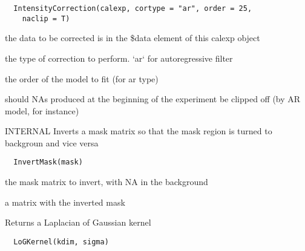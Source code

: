 \documentclass[a4paper]{book}
\begin{document}
%
\begin{Usage}
\begin{verbatim}
  IntensityCorrection(calexp, cortype = "ar", order = 25,
    naclip = T)
\end{verbatim}
\end{Usage}
%
\begin{Arguments}
\begin{ldescription}
\item[\code{calexp}] the data to be corrected is in the \$data
element of this calexp object

\item[\code{cortype}] the type of correction to perform.  `ar`
for autoregressive filter

\item[\code{order}] the order of the model to fit (for ar type)

\item[\code{naclip}] should NAs produced at the beginning of the
experiment be clipped off (by AR model, for instance)
\end{ldescription}
\end{Arguments}
%
\begin{Description}\relax
INTERNAL Inverts a mask matrix so that the mask region is
turned to backgroun and vice versa
\end{Description}
%
\begin{Usage}
\begin{verbatim}
  InvertMask(mask)
\end{verbatim}
\end{Usage}
%
\begin{Arguments}
\begin{ldescription}
\item[\code{mask}] the mask matrix to invert, with NA in the
background
\end{ldescription}
\end{Arguments}
%
\begin{Value}
a matrix with the inverted mask
\end{Value}
%
\begin{Description}\relax
Returns a Laplacian of Gaussian kernel
\end{Description}
%
\begin{Usage}
\begin{verbatim}
  LoGKernel(kdim, sigma)
\end{verbatim}
\end{Usage}
\end{document}
